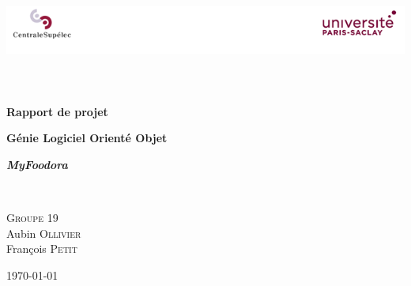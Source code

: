 \begin{titlepage}
\begin{center}

\includegraphics[width=\textwidth]{figures/logo.png}~\\[1cm]


\textsc{\Large }\\[0.5cm]

\HRule \\[0.4cm]

{\huge \bfseries Rapport de projet\\
[0.4cm] }

{\large \bfseries Génie Logiciel Orienté Objet\\[0.4cm] }

{\large \bfseries \textit{MyFoodora}\\[0.4cm] }

\HRule \\[1.5cm]



\begin{minipage}{0.4\textwidth}
\begin{flushleft} \large
\begin{center}
    \textsc{Groupe 19}\\
    \vspace{0.5cm} 
    Aubin \textsc{Ollivier}\\
    François \textsc{Petit}\\
\end{center}    
\end{flushleft}

\end{minipage}

\vfill

{\large \today}

\end{center}
\end{titlepage}